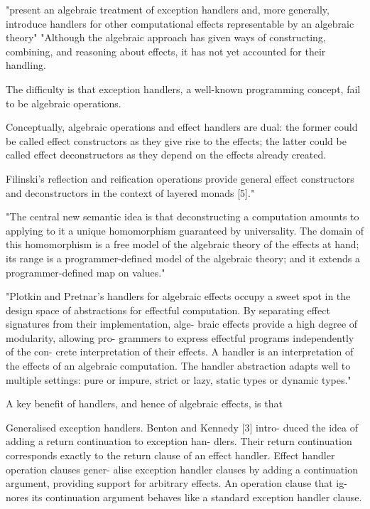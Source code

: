 "present an algebraic treatment of exception handlers and,
more generally, introduce handlers for other computational effects
representable by an algebraic theory"
"Although the algebraic approach has given ways of constructing,
combining, and reasoning about effects, it has not yet accounted for their handling.


The difficulty is that exception handlers, a well-known programming concept,
fail to be algebraic operations.

Conceptually, algebraic operations and effect handlers are dual:
the former could be called effect constructors as they give rise to the effects;
the latter could be called effect deconstructors as they depend on the effects already created.

Filinski’s reflection and reification operations provide general effect constructors
and deconstructors in the context of layered monads [5]."

"The central new semantic idea is that deconstructing a computation amounts to
applying to it a unique homomorphism guaranteed by universality.
The domain of this homomorphism is a free model of the algebraic theory of the effects at hand;
its range is a programmer-defined model of the algebraic theory;
and it extends a programmer-defined map on values."
\cite{Plotkin:2009dr}


"Plotkin and Pretnar’s handlers for algebraic effects occupy a sweet spot in the design space of abstractions for effectful computation. By separating effect signatures from their implementation, alge- braic effects provide a high degree of modularity, allowing pro- grammers to express effectful programs independently of the con- crete interpretation of their effects. A handler is an interpretation of the effects of an algebraic computation. The handler abstraction adapts well to multiple settings: pure or impure, strict or lazy, static types or dynamic types."
\cite{kammar2013handlers}

A key benefit of handlers, and hence of algebraic effects,
is that

Generalised exception handlers. Benton and Kennedy [3] intro- duced the idea of adding a return continuation to exception han- dlers. Their return continuation corresponds exactly to the return clause of an effect handler. Effect handler operation clauses gener- alise exception handler clauses by adding a continuation argument, providing support for arbitrary effects. An operation clause that ig- nores its continuation argument behaves like a standard exception handler clause.

